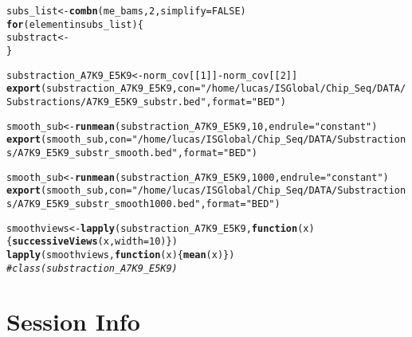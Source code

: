 \documentclass{article}\usepackage[]{graphicx}\usepackage[]{color}
\makeatletter
\newcommand{\hlstr}[1]{\textcolor[rgb]{0.192,0.494,0.8}{#1}}%
\newcommand{\hlcom}[1]{\textcolor[rgb]{0.678,0.584,0.686}{\textit{#1}}}%
\newcommand{\hlkwd}[1]{\textcolor[rgb]{0.737,0.353,0.396}{\textbf{#1}}}%
\newenvironment{kframe}{%
 \def\at@end@of@kframe{}%
 \ifinner\ifhmode%
  \def\at@end@of@kframe{\end{minipage}}%
  \begin{minipage}{\columnwidth}%
 \fi\fi%
 \def\FrameCommand##1{\hskip\@totalleftmargin \hskip-\fboxsep
 \colorbox{shadecolor}{##1}\hskip-\fboxsep
     \hskip-\linewidth \hskip-\@totalleftmargin \hskip\columnwidth}%
 \MakeFramed {\advance\hsize-\width
   \@totalleftmargin\z@ \linewidth\hsize
   \@setminipage}}%
 {\par\unskip\endMakeFramed%
 \at@end@of@kframe}
\newenvironment{knitrout}{}{} %
\makeatother
\begin{document}
\begin{knitrout}
\color{fgcolor}\begin{kframe}
\begin{alltt}
subs_list <- \hlkwd{combn}(me_bams, 2, simplify = FALSE)
\hlkwd{for} (element in subs_list)\{
  substract <- 
\}

substraction_A7K9_E5K9 <- norm_cov[[1]] - norm_cov[[2]]
\hlkwd{export}(substraction_A7K9_E5K9, con = \hlstr{"/home/lucas/ISGlobal/Chip_Seq/DATA/Substractions/A7K9_E5K9_substr.bed"}, format = \hlstr{"BED"})

smooth_sub <- \hlkwd{runmean}(substraction_A7K9_E5K9, 10, endrule = \hlstr{"constant"})
\hlkwd{export}(smooth_sub, con = \hlstr{"/home/lucas/ISGlobal/Chip_Seq/DATA/Substractions/A7K9_E5K9_substr_smooth.bed"}, format = \hlstr{"BED"})

smooth_sub <- \hlkwd{runmean}(substraction_A7K9_E5K9, 1000, endrule = \hlstr{"constant"})
\hlkwd{export}(smooth_sub, con = \hlstr{"/home/lucas/ISGlobal/Chip_Seq/DATA/Substractions/A7K9_E5K9_substr_smooth1000.bed"}, format = \hlstr{"BED"})

smoothviews <- \hlkwd{lapply}(substraction_A7K9_E5K9, \hlkwd{function}(x) \{\hlkwd{successiveViews}(x, width = 10)\})
\hlkwd{lapply}(smoothviews, \hlkwd{function}(x) \{\hlkwd{mean}(x)\})
\hlcom{#class(substraction_A7K9_E5K9)}
\end{alltt}
\end{kframe}
\end{knitrout}

\section{Session Info}%
\end{document}
